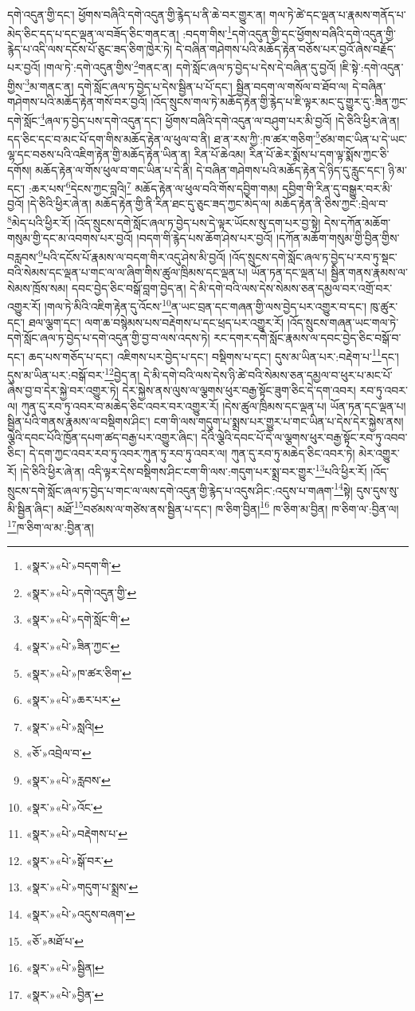 དགེ་འདུན་གྱི་དང་། ཕྱོགས་བཞིའི་དགེ་འདུན་གྱི་རྙེད་པ་ནི་ཆེ་བར་གྱུར་ན། གལ་ཏེ་ཚེ་དང་ལྡན་པ་རྣམས་གནོད་པ་མེད་ཅིང་དད་པ་དང་ལྡན་ལ་བཟོད་ཅིང་གནང་ན། :བདག་གིས་\footnote{«སྣར་»«པེ་»བདག་གི་}དགེ་འདུན་གྱི་དང་ཕྱོགས་བཞིའི་དགེ་འདུན་གྱི་རྙེད་པ་འདི་ལས་དངོས་པོ་ཅུང་ཟད་ཅིག་ཁྱེར་ཏེ། དེ་བཞིན་གཤེགས་པའི་མཆོད་རྟེན་བཅོས་པར་བྱའོ་ཞེས་བརྗོད་པར་བྱའོ། །གལ་ཏེ་:དགེ་འདུན་གྱིས་\footnote{«སྣར་»«པེ་»དགེ་འདུན་གྱི་}གནང་ན། དགེ་སློང་ཞལ་ཏ་བྱེད་པ་དེས་དེ་བཞིན་དུ་བྱའོ། །ཇི་སྟེ་:དགེ་འདུན་གྱིས་\footnote{«སྣར་»«པེ་»དགེ་སློང་གི་}མ་གནང་ན། དགེ་སློང་ཞལ་ཏ་བྱེད་པ་དེས་སྦྱིན་པ་པོ་དང་། སྦྱིན་བདག་ལ་གསོལ་བ་ཐོབ་ལ། དེ་བཞིན་གཤེགས་པའི་མཆོད་རྟེན་གསོ་བར་བྱའོ། །འོད་སྲུངས་གལ་ཏེ་མཆོད་རྟེན་གྱི་རྙེད་པ་ཇི་ལྟར་མང་དུ་གྱུར་དུ་:ཟིན་ཀྱང་དགེ་སློང་\footnote{«སྣར་»«པེ་»ཟིན་ཀྱང་}ཞལ་ཏ་བྱེད་པས་དགེ་འདུན་དང་། ཕྱོགས་བཞིའི་དགེ་འདུན་ལ་བཤུག་པར་མི་བྱའོ། །དེ་ཅིའི་ཕྱིར་ཞེ་ན། དད་ཅིང་དང་བ་མང་པོ་དག་གིས་མཆོད་རྟེན་ལ་ཕུལ་བ་ནི། ཐ་ན་རས་ཀྱི་:ཁ་ཚར་གཅིག་\footnote{«སྣར་»«པེ་»ཁ་ཚར་ཅིག་}ཙམ་གང་ཡིན་པ་དེ་ཡང་ལྷ་དང་བཅས་པའི་འཇིག་རྟེན་གྱི་མཆོད་རྟེན་ཡིན་ན། རིན་པོ་ཆེའམ། རིན་པོ་ཆེར་སྨོས་པ་དག་ལྟ་སྨོས་ཀྱང་ཅི་དགོས། མཆོད་རྟེན་ལ་གོས་ཕུལ་བ་གང་ཡིན་པ་དེ་ནི། དེ་བཞིན་གཤེགས་པའི་མཆོད་རྟེན་དེ་ཉིད་དུ་རླུང་དང་། ཉི་མ་དང་། :ཆར་པས་\footnote{«སྣར་»«པེ་»ཆར་པར་}དེངས་ཀྱང་བླའི།\footnote{«སྣར་»«པེ་»སླའི།} མཆོད་རྟེན་ལ་ཕུལ་བའི་གོས་དབྱིག་གམ། དབྱིག་གི་རིན་དུ་བསྒྱུར་བར་མི་བྱའོ། །དེ་ཅིའི་ཕྱིར་ཞེ་ན། མཆོད་རྟེན་གྱི་ནི་རིན་ཐང་དུ་ཅུང་ཟད་ཀྱང་མེད་ལ། མཆོད་རྟེན་ནི་ཅིས་ཀྱང་:བྲེལ་བ་\footnote{«ཅོ་»འབྲེལ་བ་}མེད་པའི་ཕྱིར་རོ། །འོད་སྲུངས་དགེ་སློང་ཞལ་ཏ་བྱེད་པས་དེ་ལྟར་ཡོངས་སུ་དག་པར་བྱ་སྟེ། དེས་དཀོན་མཆོག་གསུམ་གྱི་དང་མ་འབགས་པར་བྱའོ། །བདག་གི་རྙེད་པས་ཆོག་ཤེས་པར་བྱའོ། །དཀོན་མཆོག་གསུམ་གྱི་བྱིན་གྱིས་བརླབས་\footnote{«སྣར་»«པེ་»རླབས་}པའི་དངོས་པོ་རྣམས་ལ་བདག་གིར་འདུ་ཤེས་མི་བྱའོ། །འོད་སྲུངས་དགེ་སློང་ཞལ་ཏ་བྱེད་པ་རབ་ཏུ་སྡང་བའི་སེམས་དང་ལྡན་པ་གང་ལ་ལ་ཞིག་གིས་ཚུལ་ཁྲིམས་དང་ལྡན་པ། ཡོན་ཏན་དང་ལྡན་པ། སྦྱིན་གནས་རྣམས་ལ་སེམས་ཁྲོས་སམ། དབང་བྱེད་ཅིང་བསྒོ་བླག་བྱེད་ན། དེ་མི་དགེ་བའི་ལས་དེས་སེམས་ཅན་དམྱལ་བར་འགྲོ་བར་འགྱུར་རོ། །གལ་ཏེ་མིའི་འཇིག་རྟེན་དུ་འོངས་\footnote{«སྣར་»«པེ་»འོང་}ན་ཡང་བྲན་དང་གཞན་གྱི་ལས་བྱེད་པར་འགྱུར་བ་དང་། ཁུ་ཚུར་དང་། ཐལ་ལྕག་དང་། ལག་ཆ་བསྙེམས་པས་བརྡེགས་པ་དང་ཕྲད་པར་འགྱུར་རོ། །འོད་སྲུངས་གཞན་ཡང་གལ་ཏེ་དགེ་སློང་ཞལ་ཏ་བྱེད་པ་དགེ་འདུན་གྱི་བྱ་བ་ལས་འདས་ཏེ། རང་དགར་དགེ་སློང་རྣམས་ལ་དབང་བྱེད་ཅིང་བསྒོ་བ་དང་། ཆད་པས་གཅོད་པ་དང་། འཇིགས་པར་བྱེད་པ་དང་། བསྡིགས་པ་དང་། དུས་མ་ཡིན་པར་:བརྡེག་པ་\footnote{«སྣར་»«པེ་»བརྡེགས་པ་}དང་། དུས་མ་ཡིན་པར་:བསྒོ་བར་\footnote{«སྣར་»«པེ་»སྒོ་བར་}བྱེད་ན། དེ་མི་དགེ་བའི་ལས་དེས་ཉི་ཚེ་བའི་སེམས་ཅན་དམྱལ་བ་ཕུར་པ་མང་པོ་ཞེས་བྱ་བ་དེར་སྐྱེ་བར་འགྱུར་ཏེ། དེར་སྐྱེས་ནས་ལུས་ལ་ལྕགས་ཕུར་བརྒྱ་སྟོང་ཟུག་ཅིང་དེ་དག་འབར། རབ་ཏུ་འབར་ལ། ཀུན་དུ་རབ་ཏུ་འབར་བ་མཆེད་ཅིང་འབར་བར་འགྱུར་རོ། །དེས་ཚུལ་ཁྲིམས་དང་ལྡན་པ། ཡོན་ཏན་དང་ལྡན་པ། སྦྱིན་པའི་གནས་རྣམས་ལ་བསྡིགས་ཤིང་། ངག་གི་ལས་གདུག་པ་སྨྲས་པར་གྱུར་པ་གང་ཡིན་པ་དེས་དེར་སྐྱེས་ནས། ལྕེའི་དབང་པོའི་ཁྱོན་དཔག་ཚད་བརྒྱ་པར་འགྱུར་ཞིང་། དེའི་ལྕེའི་དབང་པོ་དེ་ལ་ལྕགས་ཕུར་བརྒྱ་སྟོང་རབ་ཏུ་འབབ་ཅིང་། དེ་དག་ཀྱང་འབར་རབ་ཏུ་འབར་ཀུན་ཏུ་རབ་ཏུ་འབར་ལ། ཀུན་དུ་རབ་ཏུ་མཆེད་ཅིང་འབར་ཏེ། མེར་འགྱུར་རོ། །དེ་ཅིའི་ཕྱིར་ཞེ་ན། འདི་ལྟར་དེས་བསྡིགས་ཤིང་ངག་གི་ལས་:གདུག་པར་སྨྲ་བར་གྱུར་\footnote{«སྣར་»«པེ་»གདུག་པ་སྨྲས་}པའི་ཕྱིར་རོ། །འོད་སྲུངས་དགེ་སློང་ཞལ་ཏ་བྱེད་པ་གང་ལ་ལས་དགེ་འདུན་གྱི་རྙེད་པ་འདུས་ཤིང་:འདུས་པ་གཞག་\footnote{«སྣར་»«པེ་»འདུས་བཞག་}སྟེ། དུས་དུས་སུ་མི་སྦྱིན་ཞིང་། མཐོ་\footnote{«ཅོ་»མཐོ་པ་}བཙམས་ལ་གཙེས་ནས་སྦྱིན་པ་དང་། ཁ་ཅིག་བྱིན།\footnote{«སྣར་»«པེ་»སྦྱིན།} ཁ་ཅིག་མ་བྱིན། ཁ་ཅིག་ལ་:བྱིན་ལ། \footnote{«སྣར་»«པེ་»བྱིན་}ཁ་ཅིག་ལ་མ་:བྱིན་ན། 